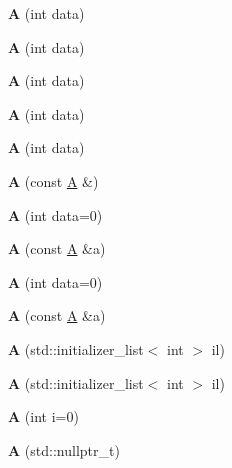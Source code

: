 \begin{DoxyCompactItemize}
{\bfseries A} (int data)
\item 
\mbox{\label{struct_a_a390d3fed20a414d5453e29eb211e78ad}} 
{\bfseries A} (int data)
\item 
\mbox{\label{struct_a_a390d3fed20a414d5453e29eb211e78ad}} 
{\bfseries A} (int data)
\item 
\mbox{\label{struct_a_a390d3fed20a414d5453e29eb211e78ad}} 
{\bfseries A} (int data)
\item 
\mbox{\label{struct_a_a390d3fed20a414d5453e29eb211e78ad}} 
{\bfseries A} (int data)
\item 
\mbox{\label{struct_a_aa0f98784263c664c8e73441c1ec951b8}} 
{\bfseries A} (const \mbox{\hyperlink{struct_a}{A}} \&)
\item 
\mbox{\label{struct_a_ad2bd2c243caf7c94caf00f03906f1d4e}} 
{\bfseries A} (int data=0)
\item 
\mbox{\label{struct_a_a5fe2ed5fdc0b213ea758eeb9c12d5a96}} 
{\bfseries A} (const \mbox{\hyperlink{struct_a}{A}} \&a)
\item 
\mbox{\label{struct_a_ad2bd2c243caf7c94caf00f03906f1d4e}} 
{\bfseries A} (int data=0)
\item 
\mbox{\label{struct_a_a5fe2ed5fdc0b213ea758eeb9c12d5a96}} 
{\bfseries A} (const \mbox{\hyperlink{struct_a}{A}} \&a)
\item 
\mbox{\label{struct_a_a2111a5e8f186095c9bec0bc7bcdf2731}} 
{\bfseries A} (std\+::initializer\+\_\+list$<$ int $>$ il)
\item 
\mbox{\label{struct_a_a2111a5e8f186095c9bec0bc7bcdf2731}} 
{\bfseries A} (std\+::initializer\+\_\+list$<$ int $>$ il)
\item 
\mbox{\label{struct_a_af517c3740aab491b7a0816078e0df3df}} 
{\bfseries A} (int i=0)
\item 
\mbox{\label{struct_a_a9abf6004473c86162132f7f191ce89ca}} 
{\bfseries A} (std\+::nullptr\+\_\+t)

\end{DoxyCompactItemize}
